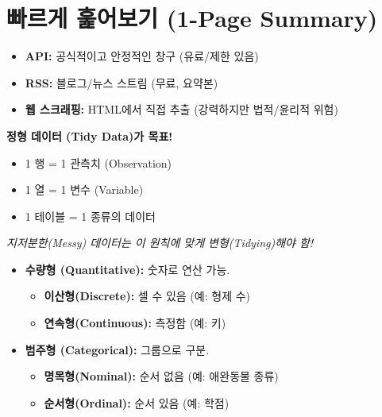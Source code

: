 \documentclass[11pt,a4paper]{book}
\theoremstyle{definition}
\begin{document}
\section{빠르게 훑어보기 (1-Page Summary)}

\begin{tcolorbox}[title={\textbf{1. 데이터 수집 (Getting Data)}, colback=gray!10}]
\begin{itemize}
    \item \textbf{API:} 공식적이고 안정적인 창구 (유료/제한 있음)
    \item \textbf{RSS:} 블로그/뉴스 스트림 (무료, 요약본)
    \item \textbf{웹 스크래핑:} HTML에서 직접 추출 (강력하지만 법적/윤리적 위험)
\end{itemize}
\end{tcolorbox}

\begin{tcolorbox}[title={\textbf{2. 데이터 구조 (Data Structure)}, colback=gray!10}]
\textbf{정형 데이터 (Tidy Data)가 목표!}
\begin{itemize}
    \item 1 행 = 1 관측치 (Observation)
    \item 1 열 = 1 변수 (Variable)
    \item 1 테이블 = 1 종류의 데이터
\end{itemize}
\textit{지저분한(Messy) 데이터는 이 원칙에 맞게 변형(Tidying)해야 함!}
\end{tcolorbox}

\begin{tcolorbox}[title={\textbf{3. 변수 유형 (Variable Types) - (중요!)}, colback=gray!10}]
\begin{itemize}
    \item \textbf{수량형 (Quantitative):} 숫자로 연산 가능.
    \begin{itemize}
        \item \textbf{이산형(Discrete):} 셀 수 있음 (예: 형제 수)
        \item \textbf{연속형(Continuous):} 측정함 (예: 키)
    \end{itemize}
    \item \textbf{범주형 (Categorical):} 그룹으로 구분.
    \begin{itemize}
        \item \textbf{명목형(Nominal):} 순서 없음 (예: 애완동물 종류)
        \item \textbf{순서형(Ordinal):} 순서 있음 (예: 학점)
    \end{itemize}
\end{itemize}
\end{tcolorbox}
\end{document}
